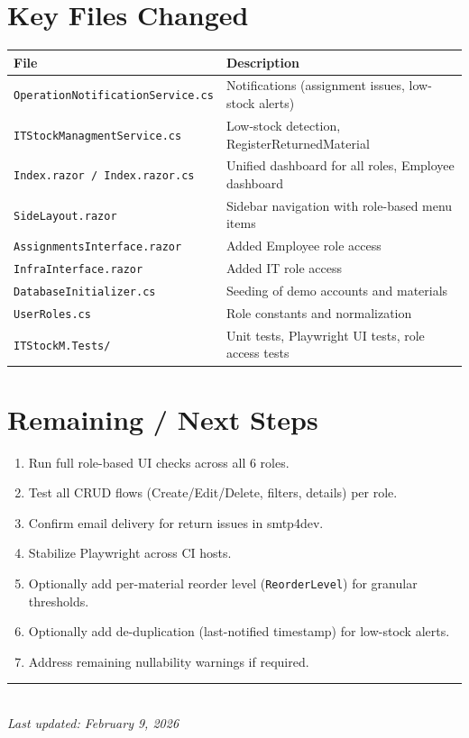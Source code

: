 \documentclass[11pt,a4paper]{article}
\begin{document}
\section{Key Files Changed}

\begin{longtable}{| l | p{8cm} |}
\hline
\textbf{File} & \textbf{Description} \\
\hline
\endfirsthead
\texttt{OperationNotificationService.cs} & Notifications (assignment issues, low-stock alerts) \\
\hline
\texttt{ITStockManagmentService.cs} & Low-stock detection, RegisterReturnedMaterial \\
\hline
\texttt{Index.razor / Index.razor.cs} & Unified dashboard for all roles, Employee dashboard \\
\hline
\texttt{SideLayout.razor} & Sidebar navigation with role-based menu items \\
\hline
\texttt{AssignmentsInterface.razor} & Added Employee role access \\
\hline
\texttt{InfraInterface.razor} & Added IT role access \\
\hline
\texttt{DatabaseInitializer.cs} & Seeding of demo accounts and materials \\
\hline
\texttt{UserRoles.cs} & Role constants and normalization \\
\hline
\texttt{ITStockM.Tests/} & Unit tests, Playwright UI tests, role access tests \\
\hline
\end{longtable}

\section{Remaining / Next Steps}
\begin{enumerate}
  \item Run full role-based UI checks across all 6 roles.
  \item Test all CRUD flows (Create/Edit/Delete, filters, details) per role.
  \item Confirm email delivery for return issues in smtp4dev.
  \item Stabilize Playwright across CI hosts.
  \item Optionally add per-material reorder level (\texttt{ReorderLevel}) for granular thresholds.
  \item Optionally add de-duplication (last-notified timestamp) for low-stock alerts.
  \item Address remaining nullability warnings if required.
\end{enumerate}

\vfill
\noindent\rule{\textwidth}{0.4pt}\\
\textit{Last updated: February 9, 2026}
\end{document}
